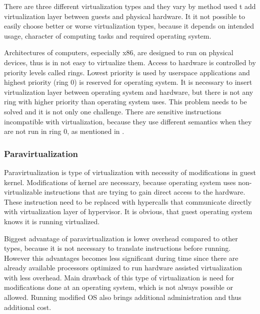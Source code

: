 
There are three different virtualization types and they vary by method used t
add virtualization layer between guests and physical hardware. It it not possible to easily choose better or worse virtualization types, because it depends on intended usage, character of computing tasks and required operating system.
 
Architectures of computers, especially x86, are designed to run on physical devices, thus is in not easy to virtualize them. Access to hardware is controlled by priority levels called rings. Lowest priority is used by userspace applications and highest priority (ring 0) is reserved for operating system. It is necessary to insert virtualization layer between operating system and hardware, but there is not any ring with higher priority than operating system uses. This problem needs to be solved and it is not only one challenge. There are sensitive instructions incompatible with virtualization, because they use different semantics when they are not run in ring 0, as mentioned in \cite{vmware-para}.

\subsubsection{Paravirtualization}
Paravirtualization is type of virtualization with necessity of modifications in guest kernel. Modifications of kernel are necessary, because operating system uses non-virtualizable instructions that are trying to gain direct access to the hardware. These instruction need to be replaced with hypercalls that communicate directly with virtualization layer of hypervisor. \cite{vmware-para} It is obvious, that guest operating system knows it is running virtualized. 

Biggest advantage of paravirtualization is lower overhead compared to other types, because it is not necessary to translate instructions before running. However this advantages becomes less significant during time since there are already available processors optimized to run hardware assisted virtualization with less overhead. Main drawback of this type of virtualization is need for modifications done at an operating system, which is not always possible or allowed. Running modified \Ac{OS} also brings additional administration and thus additional cost.

